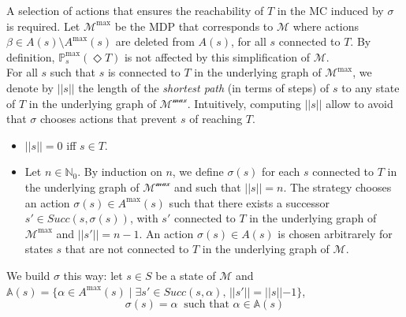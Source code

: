 A selection of actions that ensures
the reachability of $T$ in the
MC induced by $\sigma$ is required.
Let $\mathcal{M}^{\max}$ be the MDP that corresponds to $\mathcal{M}$
where actions $\beta \in A(s) \setminus A^{\max}(s)$ are deleted from $A(s)$,
for all $s$ connected to $T$.
By definition, $\mathbb{P}^{\max}_s(\Diamond T)$ is not affected by this simplification of
$\mathcal{M}$. \\

For all $s$ such that $s$ is connected to $T$ in the underlying graph of
$\mathcal{M}^{\max}$, we denote by $||s||$ the length of the \textit{shortest path} (in terms of steps) of $s$ to any state of $T$ in the underlying graph of
$\mathcal{M^{\max}}$. Intuitively, computing $||s||$ allow to avoid that $\sigma$ chooses
actions that prevent $s$ of reaching $T$.
\begin{itemize}
	\renewcommand{\labelitemi}{\tiny$\bullet$}
	\item $||s|| = 0$ iff $s \in T$.
	\item Let $n \in \mathbb{N}_0$. By induction on $n$, we define
		$\sigma(s)$ for each $s$ connected to $T$ in the underlying graph of
		$\mathcal{M^{\max}}$ and such that $||s|| = n$.
		The strategy chooses an action $\sigma(s) \in A^{\max}(s)$ such that there exists a successor $s' \in Succ(s, \sigma(s))$, with $s'$ connected to $T$ in the underlying graph of
		$\mathcal{M}^{\max}$ and $||s'|| = n - 1$. An action $\sigma(s) \in A(s)$ is chosen
		arbitrarely for states $s$ that are not connected to $T$ in the underlying graph of $\mathcal{M}$.
\end{itemize}
We build $\sigma$ this way: let $s \in S$ be a state of $\mathcal{M}$ and $\mathbb{A}(s) = \{\alpha \in A^{\max}(s) \; | \; \exists s' \in Succ(s,
	\alpha), \, ||s'|| = ||s|| - 1 \}$,
\[
	\sigma(s) = \alpha \;\; \text{such that } \alpha \in \mathbb{A}(s)
\]

